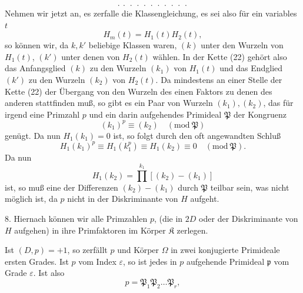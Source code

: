 \[
\cdot\ \cdot\ \cdot\ \cdot\ \cdot\ \cdot\ \cdot\ \cdot\ \cdot\ \cdot\ \cdot
\]
Nehmen wir jetzt an, es zerfalle die Klassengleichung, es sei
also für ein variables $t$
\[
H_m(t) = H_1(t) H_2(t),
\]
so können wir, da $k, k'$ beliebige Klassen waren, $(k)$ unter den
Wurzeln von $H_1(t)$, $(k')$ unter denen von $H_2(t)$ wählen. In der
Kette (22) gehört also das Anfangsglied $(k)$ zu den Wurzeln $(k_1)$
von $H_1(t)$ und das Endglied $(k')$ zu den Wurzeln $(k_2)$ von $H_2(t)$.
Da mindestens an einer Stelle der Kette (22) der Übergang von
den Wurzeln des einen Faktors zu denen des anderen stattfinden
muß, so gibt es ein Paar von Wurzeln $(k_1), (k_2)$, das für irgend
eine Primzahl $p$ und ein darin aufgehendes Primideal $\mathfrak P$ der
Kongruenz
\[
(k_1)^p \equiv (k_2) \quad (\mathrm{mod}\ \mathfrak P)
\]
genügt. Da nun $H_1(k_1) = 0$ ist, so folgt durch den oft angewandten Schluß
\[
H_1(k_1)^p \equiv H_1(k_1^p) \equiv H_1(k_2) \equiv 0 \quad (\mathrm{mod}\ \mathfrak P).
\]
Da nun
\[
H_1(k_2) = \prod^{k_1} [(k_2) - (k_1)]
\]
ist, so muß eine der Differenzen $(k_2) - (k_1)$ durch $\mathfrak P$ teilbar sein,
was nicht möglich ist, da $p$ nicht in der Diskriminante von $H$
aufgeht.


8. Hiernach können wir alle Primzahlen $p$,  (die in $2D$
oder der Diskriminante von $H$ aufgehen) in ihre Primfaktoren
im Körper $\mathfrak K$ zerlegen.

Ist $(D, p) = +1$, so zerfällt $p$ und Körper $\Omega$ %
in zwei konjugierte Primideale ersten Grades. Ist $p$ vom Index $\varepsilon$, so ist
jedes in $p$ aufgehende Primideal $\mathfrak p$ vom Grade $\varepsilon$. Ist also
\[
p = \mathfrak P_1 \mathfrak P_2 \ldots \mathfrak P_r,
\]

